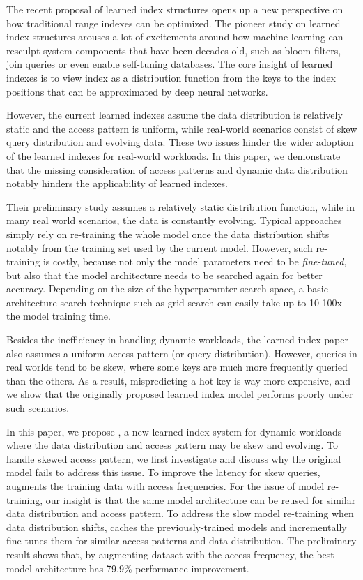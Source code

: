 \begin{englishabstract}

The recent proposal of learned index structures opens up a new perspective on how traditional range indexes can be optimized.
The pioneer study on learned index structures arouses a lot of excitements around how machine learning can resculpt system components that have been decades-old, such as bloom filters, join queries or even enable self-tuning databases.
The core insight of learned indexes is to view index as a distribution function from the keys to the index positions that can be approximated by deep neural networks.

However, the current learned indexes assume the data distribution is relatively static and the access pattern is uniform, while real-world scenarios consist of skew query distribution and evolving data.
These two issues hinder the wider adoption of the learned indexes for real-world workloads.
In this paper, we demonstrate that the missing consideration of access patterns and dynamic data distribution notably hinders the applicability of learned indexes.

Their preliminary study assumes a relatively static distribution function, while in many real world scenarios, the data is constantly evolving.
Typical approaches simply rely on re-training the whole model once the data distribution shifts notably from the training set used by the current model.
However, such re-training is costly, because not only the model parameters need to be \textit{fine-tuned}, but also that the model architecture needs to be searched again for better accuracy.
Depending on the size of the hyperparamter search space, a basic architecture search technique such as grid search can easily take up to 10-100x the model training time.

Besides the inefficiency in handling dynamic workloads, the learned index paper also assumes a uniform access pattern (or query distribution).
However, queries in real worlds tend to be skew, where some keys are much more frequently queried than the others.
As a result, mispredicting a hot key is way more expensive, and we show that the originally proposed learned index model performs poorly under such scenarios.

In this paper, we propose \sys, a new learned index system for dynamic workloads where the data distribution and access pattern may be skew and evolving.
To handle skewed access pattern, we first investigate and discuss why the original model fails to address this issue.
To improve the latency for skew queries, \sys augments the training data with access frequencies.
For the issue of model re-training, our insight is that the same model architecture can be reused for similar data distribution and access pattern.
To address the slow model re-training when data distribution shifts, \sys caches the previously-trained models and incrementally fine-tunes them for similar access patterns and data distribution.
The preliminary result shows that, by augmenting dataset with the access frequency, the best model architecture has 79.9\% performance improvement.

\end{englishabstract}
